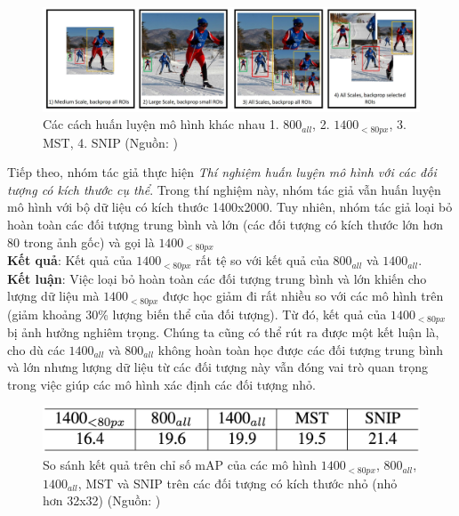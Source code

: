 {    \begin{figure}[H]
        \centering
        \includegraphics[width=15cm] {images/snip_model_compare}
        \caption{Các cách huấn luyện mô hình khác nhau 1. ${800}_{all}$, 2. ${1400}_{<80px}$, 3. MST, 4. SNIP (Nguồn: \cite{singh2018analysis})}
        \label{fig:snip_model_compare}
    \end{figure}

    \noindent
    Tiếp theo, nhóm tác giả thực hiện \textit{Thí nghiệm huấn luyện mô hình với các đối tượng có kích thước cụ thể}.
    Trong thí nghiệm này, nhóm tác giả vẫn huấn luyện mô hình với bộ dữ liệu có kích thước 1400x2000.
    Tuy nhiên, nhóm tác giả loại bỏ hoàn toàn các đối tượng trung bình và lớn (các đối tượng có kích thước lớn hơn 80 trong ảnh gốc) và gọi là ${1400}_{<80px}$ \\
    \textbf{Kết quả}:
    Kết quả của ${1400}_{<80px}$ rất tệ so với kết quả của ${800}_{all}$ và ${1400}_{all}$. \\
    \textbf{Kết luận}:
    Việc loại bỏ hoàn toàn các đối tượng trung bình và lớn khiến cho lượng dữ liệu mà ${1400}_{<80px}$ được học giảm đi rất nhiều so với các mô hình trên (giảm khoảng 30\% lượng biến thể của đối tượng).
    Từ đó, kết quả của ${1400}_{<80px}$ bị ảnh hưởng nghiêm trọng.
    Chúng ta cũng có thể rút ra được một kết luận là, cho dù các ${1400}_{all}$ và ${800}_{all}$ không hoàn toàn học được các đối tượng trung bình và lớn nhưng lượng dữ liệu từ các đối tượng này vẫn đóng vai trò quan trọng trong việc giúp các mô hình xác định các đối tượng nhỏ.

    \begin{figure}[H]
        \centering
        \includegraphics[width=13cm] {images/snip_results_1}
        \caption{So sánh kết quả trên chỉ số mAP của các mô hình ${1400}_{<80px}$, ${800}_{all}$, ${1400}_{all}$, MST và SNIP trên các đối tượng có kích thước nhỏ (nhỏ hơn 32x32) (Nguồn: \cite{singh2018analysis})}
        \label{fig:snip_results_1}
    \end{figure}

}
